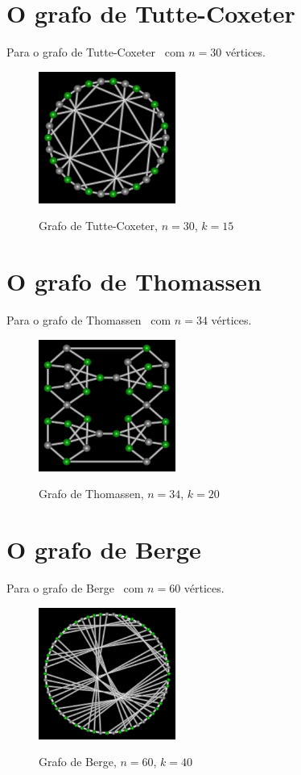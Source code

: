 \section{O grafo de Tutte-Coxeter}
Para o grafo de Tutte-Coxeter~\cite{cite:example-tutte} com $n=30$
vértices.

\begin{figure}[htb]
\centering
\includegraphics[width=0.4\textwidth]{img/tutte.png}
\label{fig:example-tutte}
\caption{Grafo de Tutte-Coxeter, $n=30$, $k=15$}
\end{figure}


\section{O grafo de Thomassen}
Para o grafo de Thomassen~\cite{cite:example-thomassen} com $n=34$
vértices.

\begin{figure}[htb]
\centering
\includegraphics[width=0.4\textwidth]{img/thomassen.png}
\label{fig:example-thomassen}
\caption{Grafo de Thomassen, $n=34$, $k=20$}
\end{figure}


\section{O grafo de Berge}
Para o grafo de Berge~\cite{cite:example-berge} com $n=60$ vértices.

\begin{figure}[htb]
\centering
\includegraphics[width=0.4\textwidth]{img/berge.png}
\label{fig:example-berge}
\caption{Grafo de Berge, $n=60$, $k=40$}
\end{figure}


